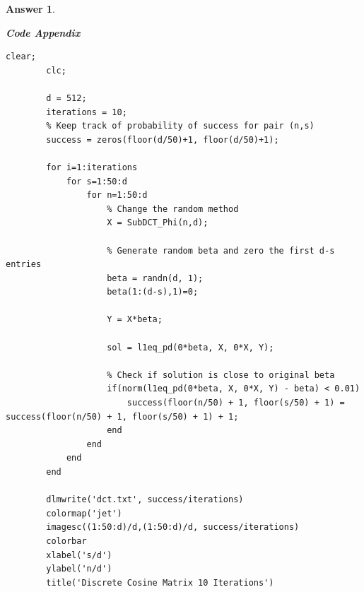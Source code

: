 \documentclass[12pt]{article}
\theoremstyle{colon}
\newtheorem*{answer}{Answer}
\begin{document}
\begin{answer}
\begin{enumerate}[label=\arabic*)]
      \textbf{Code Appendix}

      \begin{lstlisting}[style=Matlab-editor, basicstyle=\scriptsize]
        clear;
        clc;

        d = 512;
        iterations = 10;
        % Keep track of probability of success for pair (n,s)
        success = zeros(floor(d/50)+1, floor(d/50)+1);

        for i=1:iterations
            for s=1:50:d
                for n=1:50:d
                    % Change the random method
                    X = SubDCT_Phi(n,d);

                    % Generate random beta and zero the first d-s entries
                    beta = randn(d, 1);
                    beta(1:(d-s),1)=0;

                    Y = X*beta;

                    sol = l1eq_pd(0*beta, X, 0*X, Y);

                    % Check if solution is close to original beta
                    if(norm(l1eq_pd(0*beta, X, 0*X, Y) - beta) < 0.01)
                        success(floor(n/50) + 1, floor(s/50) + 1) = success(floor(n/50) + 1, floor(s/50) + 1) + 1;
                    end
                end
            end
        end

        dlmwrite('dct.txt', success/iterations)
        colormap('jet')
        imagesc((1:50:d)/d,(1:50:d)/d, success/iterations)
        colorbar
        xlabel('s/d')
        ylabel('n/d')
        title('Discrete Cosine Matrix 10 Iterations')
      \end{lstlisting}
  \end{enumerate}
\end{answer}
\end{document}
